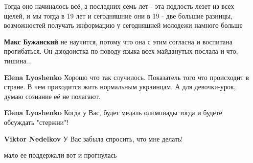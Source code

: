 \begin{itemize}
\begin{itemize}
Тогда оно начиналось всё, а последних семь лет - эта подлость лезет из всех
щелей, и мы тогда в 19 лет и сегодняшние они в 19 - две большие разницы,
возможностей получать информацию у сегодняшней молодежи намного больше

 
\textbf{Макс Бужанский} не научится, потому что она с этим согласна и воспитана
прогибаться. Он дзюдоистка по поводу языка всех майданутых послала и что,
тишина...

 
\textbf{Elena Lyoshenko} Хорошо что так случилось. Показатель того что
происходит в стране. В чем приходится жить нормальным украинцам. А для
девочки-урок, думаю сознание её не полагают.

 
\textbf{Elena Lyoshenko} Когда у Вас, будет медаль олимпиады тогда и будете обсуждать "стержни"!

 

\textbf{Viktor Nedelkov}
У Вас забыла спросить, что мне делать!

\end{itemize}

 
мало ее поддержали вот и прогнулась


\end{itemize}
